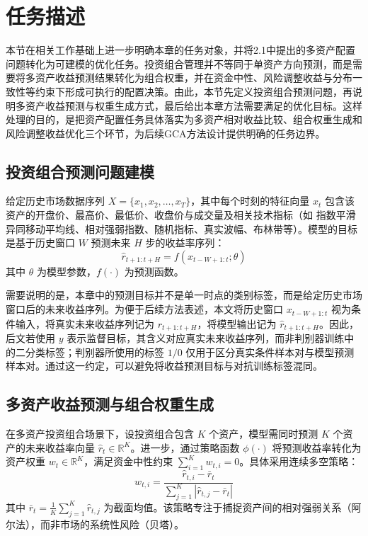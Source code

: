 \section{任务描述}

本节在相关工作基础上进一步明确本章的任务对象，并将2.1中提出的多资产配置问题转化为可建模的优化任务。投资组合管理并不等同于单资产方向预测，而是需要将多资产收益预测结果转化为组合权重，并在资金中性、风险调整收益与分布一致性等约束下形成可执行的配置决策。由此，本节先定义投资组合预测问题，再说明多资产收益预测与权重生成方式，最后给出本章方法需要满足的优化目标。这样处理的目的，是把资产配置任务具体落实为多资产相对收益比较、组合权重生成和风险调整收益优化三个环节，为后续GCA方法设计提供明确的任务边界。

\subsection{投资组合预测问题建模}

给定历史市场数据序列 $X = \{x_1, x_2, \ldots, x_T\}$，其中每个时刻的特征向量 $x_t$ 包含该资产的开盘价、最高价、最低价、收盘价与成交量及相关技术指标（如 指数平滑异同移动平均线、相对强弱指数、随机指标、真实波幅、布林带等）。模型的目标是基于历史窗口 $W$ 预测未来 $H$ 步的收益率序列：
\[
\hat{r}_{t+1:t+H} = f(x_{t-W+1:t}; \theta)
\]
其中 $\theta$ 为模型参数，$f(\cdot)$ 为预测函数。

需要说明的是，本章中的预测目标并不是单一时点的类别标签，而是给定历史市场窗口后的未来收益序列。为便于后续方法表述，本文将历史窗口 $x_{t-W+1:t}$ 视为条件输入，将真实未来收益序列记为 $r_{t+1:t+H}$，将模型输出记为 $\hat{r}_{t+1:t+H}$。因此，后文若使用 $y$ 表示监督目标，其含义对应真实未来收益序列，而非判别器训练中的二分类标签；判别器所使用的标签 $1/0$ 仅用于区分真实条件样本对与模型预测样本对。通过这一约定，可以避免将收益预测目标与对抗训练标签混同。


\subsection{多资产收益预测与组合权重生成}

在多资产投资组合场景下，设投资组合包含 $K$ 个资产，模型需同时预测 $K$ 个资产的未来收益率向量 $\hat{r}_t \in \mathbb{R}^K$。进一步，通过策略函数 $\phi(\cdot)$ 将预测收益率转化为资产权重 $w_t \in \mathbb{R}^K$，满足资金中性约束 $\sum_{i=1}^K w_{t,i} = 0$。具体采用连续多空策略：
\[
w_{t,i} = \frac{\hat{r}_{t,i} - \bar{r}_t}{\sum_{j=1}^K |\hat{r}_{t,j} - \bar{r}_t|}
\]
其中 $\bar{r}_t = \frac{1}{K}\sum_{j=1}^K \hat{r}_{t,j}$ 为截面均值。该策略专注于捕捉资产间的相对强弱关系（阿尔法），而非市场的系统性风险（贝塔）。


